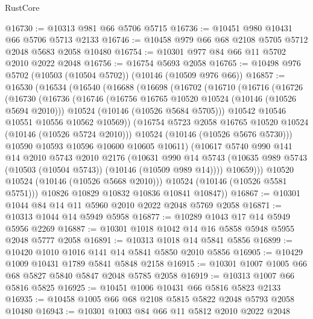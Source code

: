 \begin{lexlean}{RustCore}
\begin{coremodule}
@16730 := @10313 @981 @66 @5706 @5715
@16736 := @10451 @980 @10431 @66 @5706 @5713 @2133
@16746 := @10458 @979 @66 @68 @2108 @5705 @5712 @2048 @5683 @2058 @10480
@16754 := @10301 @977 @84 @66 @11 @5702 @2010 @2022 @2048
@16756 := @16754 @5693 @2058
@16765 := @10498 @976 @5702 (@10503 (@10504 @5702)) (@10146 (@10509 @976 @66))
@16857 := @16530
    (@16534
      (@16540
        (@16688
          (@16698
            (@16702
              (@16710
                (@16716
                  (@16726
                    (@16730
                      (@16736
                        (@16746
                          (@16756 @16765 @10520 @10524 (@10146 (@10526 @5694 @2010)))
                          @10524
                          (@10146 (@10526 @5684 @5705)))
                        @10542
                        @10546
                        @10551
                        @10556
                        @10562
                        @10569))
                    (@16754 @5723 @2058 @16765 @10520 @10524 (@10146 (@10526 @5724 @2010)))
                    @10524
                    (@10146 (@10526 @5676 @5730)))
                  @10590
                  @10593
                  @10596
                  @10600
                  @10605
                  @10611)
                (@10617
                  @5740
                  @990
                  @141
                  @14
                  @2010
                  @5743
                  @2010
                  @2176
                  (@10631
                    @990
                    @14
                    @5743
                    (@10635 @989 @5743 (@10503 (@10504 @5743)) (@10146 (@10509 @989 @14))))
                  @10659)))
            @10520
            @10524
            (@10146 (@10526 @5668 @2010)))
          @10524
          (@10146 (@10526 @5581 @5751)))
        @10826
        @10829
        @10832
        @10836
        @10841
        @10847))
@16867 := @10301 @1044 @84 @14 @11 @5960 @2010 @2022 @2048 @5769 @2058
@16871 := @10313 @1044 @14 @5949 @5958
@16877 := @10289 @1043 @17 @14 @5949 @5956 @2269
@16887 := @10301 @1018 @1042 @14 @16 @5858 @5948 @5955 @2048 @5777 @2058
@16891 := @10313 @1018 @14 @5841 @5856
@16899 := @10420 @1010 @1016 @141 @14 @5841 @5850 @2010 @5856
@16905 := @10429 @1009 @10431 @1789 @5841 @5848 @2158
@16915 := @10301 @1007 @1005 @66 @68 @5827 @5840 @5847 @2048 @5785 @2058
@16919 := @10313 @1007 @66 @5816 @5825
@16925 := @10451 @1006 @10431 @66 @5816 @5823 @2133
@16935 := @10458 @1005 @66 @68 @2108 @5815 @5822 @2048 @5793 @2058 @10480
@16943 := @10301 @1003 @84 @66 @11 @5812 @2010 @2022 @2048

\end{coremodule}
\end{lexlean}
